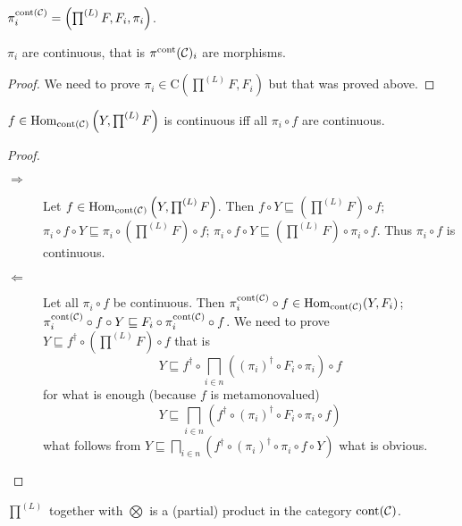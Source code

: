 \begin{defn}
  $\pi^{\operatorname{cont} (\mathcal{C})}_i = \left( \prod^{(L)} F , F_i ,
  \pi_i \right)$.
\end{defn}

\begin{prop}
  $\pi_i$ are continuous, that is $\pi^{\operatorname{cont}}
  (\mathcal{C})_i$ are morphisms.
\end{prop}

\begin{proof}
  We need to prove $\pi_i \in \mathrm{C} \left( \prod^{(L)} F , F_i \right)$
  but that was proved above.
\end{proof}

\begin{lem}
  $f \in \operatorname{Hom}_{\operatorname{cont} (\mathcal{C})} \left( Y ,
  \prod^{(L)} F \right)$ is continuous iff all $\pi_i \circ f$ are continuous.
\end{lem}

\begin{proof}
  ~
  \begin{description}
    \item[$\Rightarrow$] Let $f \in \operatorname{Hom}_{\operatorname{cont}
    (\mathcal{C})} \left( Y , \prod^{(L)} F \right)$. Then $f \circ Y
    \sqsubseteq \left( \prod^{(L)} F \right) \circ f$; $\pi_i \circ f \circ Y
    \sqsubseteq \pi_i \circ \left( \prod^{(L)} F \right) \circ f$; $\pi_i
    \circ f \circ Y \sqsubseteq \left( \prod^{(L)} F \right) \circ \pi_i \circ
    f$. Thus $\pi_i \circ f$ is continuous.
    
    \item[$\Leftarrow$] Let all $\pi_i \circ f$ be continuous. Then
    $\pi^{\operatorname{cont} (\mathcal{C})}_i \circ f \in
    \operatorname{Hom}_{\operatorname{cont} (\mathcal{C})} (Y , F_i)$;
    $\pi^{\operatorname{cont} (\mathcal{C})}_i \circ f \circ Y \sqsubseteq
    F_i \circ \pi^{\operatorname{cont} (\mathcal{C})}_i \circ f$. We need
    to prove $Y \sqsubseteq f^{\dagger} \circ \left( \prod^{(L)} F \right)
    \circ f$ that is
    \[ Y \sqsubseteq f^{\dagger} \circ \bigsqcap_{i \in n} ((\pi_i)^{\dagger}
       \circ F_i \circ \pi_i) \circ f \]
    for what is enough (because $f$ is metamonovalued)
    \[ Y \sqsubseteq \bigsqcap_{i \in n} (f^{\dagger} \circ (\pi_i)^{\dagger}
       \circ F_i \circ \pi_i \circ f) \]
    what follows from $Y \sqsubseteq \bigsqcap_{i \in n} (f^{\dagger} \circ
    (\pi_i)^{\dagger} \circ \pi_i \circ f \circ Y)$ what is obvious.
  \end{description}
\end{proof}

\begin{thm}
  $\prod^{(L)}$ together with $\bigotimes$ is a (partial) product in the
  category $\operatorname{cont} (\mathcal{C})$.
\end{thm}

